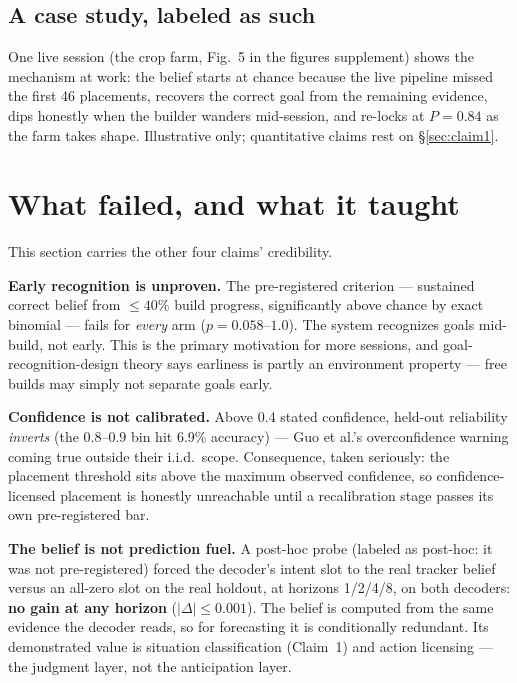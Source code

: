 \documentclass[11pt]{article}
\begin{document}
\subsection{A case study, labeled as such}

One live session (the crop farm, Fig.~5 in the figures supplement) shows the
mechanism at work: the belief starts at chance because the live pipeline missed
the first 46 placements, recovers the correct goal from the remaining
evidence, dips honestly when the builder wanders mid-session, and re-locks at
$P=0.84$ as the farm takes shape. Illustrative only; quantitative claims rest
on \S\ref{sec:claim1}.

\section{What failed, and what it taught}
\label{sec:failed}

This section carries the other four claims' credibility.

\textbf{Early recognition is unproven.} The pre-registered criterion ---
sustained correct belief from $\le 40\%$ build progress, significantly above
chance by exact binomial --- fails for \emph{every} arm ($p = 0.058$--$1.0$).
The system recognizes goals mid-build, not early. This is the primary
motivation for more sessions, and goal-recognition-design theory
\cite{grdsurvey} says earliness is partly an environment property --- free
builds may simply not separate goals early.

\textbf{Confidence is not calibrated.} Above 0.4 stated confidence, held-out
reliability \emph{inverts} (the 0.8--0.9 bin hit 6.9\% accuracy) --- Guo et
al.'s overconfidence warning \cite{guo} coming true outside their i.i.d.\
scope. Consequence, taken seriously: the placement threshold sits above the
maximum observed confidence, so confidence-licensed placement is honestly
unreachable until a recalibration stage passes its own pre-registered bar.

\textbf{The belief is not prediction fuel.} A post-hoc probe (labeled as
post-hoc: it was not pre-registered) forced the decoder's intent slot to the
real tracker belief versus an all-zero slot on the real holdout, at horizons
1/2/4/8, on both decoders: \textbf{no gain at any horizon} ($|\Delta| \le
0.001$). The belief is computed from the same evidence the decoder reads, so
for forecasting it is conditionally redundant. Its demonstrated value is
situation classification (Claim~1) and action licensing --- the judgment
layer, not the anticipation layer.
\end{document}
